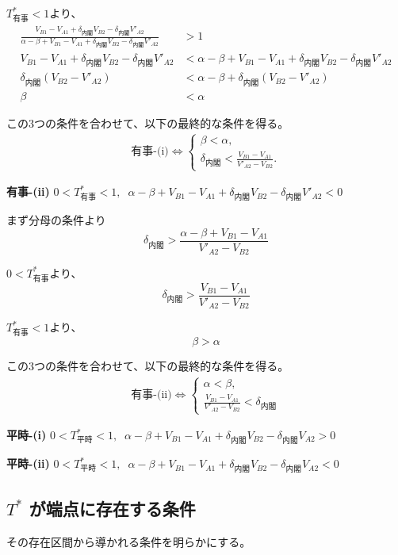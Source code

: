 \documentclass[main.tex]{subfiles}
\begin{document}
$T^*_{有事}<1$より、
\begin{align*}
    \frac{ V_{B1} - V_{A1} +\delta_{内閣}V_{B2} - \delta_{内閣}V'_{A2} }{ \alpha-\beta + V_{B1}-V_{A1} + \delta_{内閣}V_{B2} - \delta_{内閣}V'_{A2} } &> 1\\
    V_{B1} - V_{A1} +\delta_{内閣}V_{B2} - \delta_{内閣}V'_{A2} &< \alpha-\beta + V_{B1}-V_{A1} + \delta_{内閣}V_{B2} - \delta_{内閣}V'_{A2}\\
    \delta_{内閣}(V_{B2} - V'_{A2}) &< \alpha-\beta + \delta_{内閣}(V_{B2} - V'_{A2})\\
    \beta &< \alpha
\end{align*}

この3つの条件を合わせて、以下の最終的な条件を得る。
\begin{align*}
    \text{有事-(i)} \Leftrightarrow 
    \begin{cases}
        \beta < \alpha, \\
        \delta_{内閣} < \frac{V_{B1}-V_{A1}}{V'_{A2} - V_{B2}}.
    \end{cases}
\end{align*}



\bigskip
\noindent
\textbf{有事-(ii)}\; $0<T^*_{有事}<1,\;\; \alpha-\beta + V_{B1}-V_{A1} + \delta_{内閣}V_{B2} - \delta_{内閣}V'_{A2} < 0$

まず分母の条件より
$$\delta_{内閣} > \frac{\alpha-\beta + V_{B1}-V_{A1}}{V'_{A2} - V_{B2}}$$

$0<T^*_{有事}$より、
$$\delta_{内閣} > \frac{V_{B1} - V_{A1}}{V'_{A2} - V_{B2}}$$

$T^*_{有事}<1$より、
$$\beta > \alpha$$

この3つの条件を合わせて、以下の最終的な条件を得る。
\begin{align*}
    \text{有事-(ii)} \Leftrightarrow 
    \begin{cases}
        \alpha < \beta, \\
        \frac{V_{B1}-V_{A1}}{V'_{A2} - V_{B2}} < \delta_{内閣}
    \end{cases}
\end{align*}



\noindent
\textbf{平時-(i)}\; $0<T^*_{平時}<1,\;\; \alpha-\beta + V_{B1}-V_{A1} + \delta_{内閣}V_{B2} - \delta_{内閣}V_{A2}　> 0$


\noindent
\textbf{平時-(ii)}\; $0<T^*_{平時}<1,\;\; \alpha-\beta + V_{B1}-V_{A1} + \delta_{内閣}V_{B2} - \delta_{内閣}V_{A2}　< 0$








\subsection{$T^*$ が端点に存在する条件}

その存在区間から導かれる条件を明らかにする。


\theendnotes %
\end{document}

